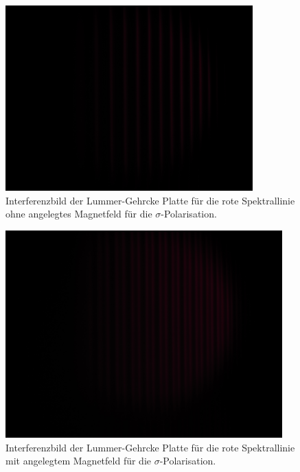 \newpage
{}
\label{sec:Anhang}

\begin{figure}[h!]
  \centering
  \includegraphics[width=0.85\textwidth]{data/temp/rot_ohneB_0.JPG}
  \caption{Interferenzbild der Lummer-Gehrcke Platte für die rote Spektrallinie ohne angelegtes Magnetfeld für die $\sigma$-Polarisation.}
  \label{fig:rotOhneB0}
\end{figure}
\begin{figure}[h!]
  \centering
  \includegraphics[width=0.95\textwidth]{data/temp/rot_mitB_0.JPG}
  \caption{Interferenzbild der Lummer-Gehrcke Platte für die rote Spektrallinie mit angelegtem Magnetfeld für die $\sigma$-Polarisation.}
  \label{fig:rotMitB0}
\end{figure}

